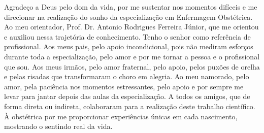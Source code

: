 Agradeço a Deus pelo dom da vida, por me sustentar nos momentos difíceis e me direcionar na realização do sonho da especialização em Enfermagem Obstétrica.
Ao meu orientador, Prof. Dr. Antonio Rodrigues Ferreira Júnior, que me orientou e auxiliou nessa trajetória de conhecimento. Tenho o senhor como referência de profissional.
Aos meus pais, pelo apoio incondicional, pois não mediram esforços durante toda a especialização, pelo amor e por me tornar a pessoa e o profissional que sou.
Aos meus irmãos, pelo amor fraternal, pelo apoio, pelos puxões de orelha e pelas risadas que transformaram o choro em alegria.
Ao meu namorado, pelo amor, pela paciência nos momentos estressantes, pelo apoio e por sempre me levar para jantar depois das aulas da especialização.
A todos os amigos, que de forma direta ou indireta, colaboraram para a realização deste trabalho científico.
À obstétrica por me proporcionar experiências únicas em cada nascimento, mostrando o sentindo real da vida.
